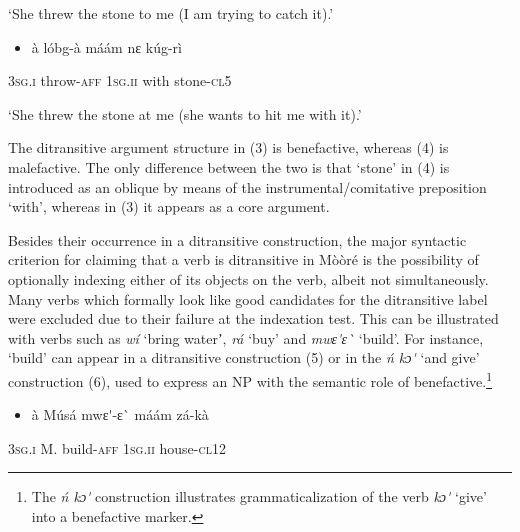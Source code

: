 \documentclass[output=paper]{langsci/langscibook}
\begin{document}
\begin{styleTranslation}
‘She threw the stone to me (I am trying to catch it).’
\end{styleTranslation}

\begin{itemize}
\item \begin{styleNumberedEX}
\label{bkm:Ref446636099}\`{a}    l\'{o}bg-\`{a}    m\'{a}\'{a}m    nɛ  k\'{u}g-r\`{i}
\end{styleNumberedEX}\end{itemize}
\begin{styleGloss}
\textsc{3sg.i  }  throw-\textsc{aff}  \textsc{1sg.ii  }  with  stone-\textsc{cl5}
\end{styleGloss}

\begin{styleTranslation}
‘She threw the stone at me (she wants to hit me with it).’
\end{styleTranslation}

The ditransitive argument structure in (3) is benefactive, whereas (4) is malefactive. The only difference between the two is that ‘stone’ in (4) is introduced as an oblique by means of the instrumental/comitative preposition ‘with’, whereas in (3) it appears as a core argument. 

Besides their occurrence in a ditransitive construction, the major syntactic criterion for claiming that a verb is ditransitive in M\`{o}\`{o}r\'{e} is the possibility of optionally indexing either of its objects on the verb, albeit not simultaneously. Many verbs which formally look like good candidates for the ditransitive label were excluded due to their failure at the indexation test. This can be illustrated with verbs such as \textit{w\'{i}} ‘bring waterʼ, \textit{r\'{a}} ‘buy’ and \textit{mwɛ\'{ }ɛ\`{ }} ‘build’. For instance, ‘build’ can appear in a ditransitive construction (5) or in the \textit{\'{n} kɔ\'{ }} ‘and give’ construction (6), used to express an NP with the semantic role of benefactive.\footnote{ The\textit{ \'{n} kɔ\'{ }} construction illustrates grammaticalization of the verb \textit{kɔ\'{ }} ‘give’ into a benefactive marker.} 

\begin{itemize}
\item \begin{styleNumberedEX}
\label{bkm:Ref446636172}\`{a}    M\'{u}s\'{a}  mwɛ\'{ }-ɛ\`{ }    m\'{a}\'{a}m    z\'{a}-k\`{a}
\end{styleNumberedEX}\end{itemize}
\begin{styleGloss}
\textsc{3sg.i  }  M.  build-\textsc{aff}  \textsc{1sg.ii  }  house-\textsc{cl12}
\end{styleGloss}
\end{document}
